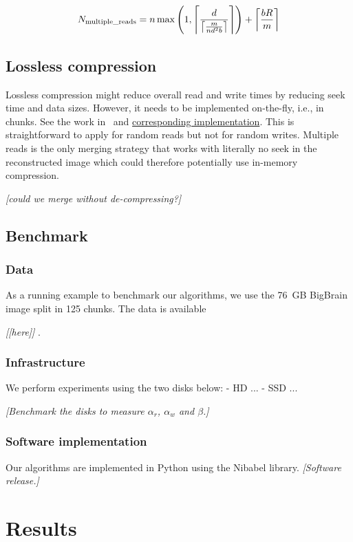 \documentclass[10pt, conference, compsocconf]{IEEEtran}
\DeclarePairedDelimiter{\ceil}{\lceil}{\rceil}
\newcommand{\todo}[1]{
  \color{red}\emph{[#1]}
  \color{black}
}
\begin{document}
\begin{equation}
  N_\mathrm{multiple\_reads}= n \max\left(1,\ceil*{\frac{d}{\ceil*{\frac{m}{nd^2b}}}}\right)+ \ceil*{\frac{bR}{m}}
\end{equation}

\subsection{Lossless compression}
     
Lossless compression might reduce overall read and write times by
reducing seek time and data sizes. However, it needs to be implemented
on-the-fly, i.e., in chunks. See the work in~\cite{rajna2015speeding}
and
\href{https://github.com/pauldmccarthy/indexed\_gzip}{corresponding
  implementation}. This is straightforward to apply for random reads
but not for random writes. Multiple reads is the only merging strategy
that works with literally no seek in the reconstructed image which
could therefore potentially use in-memory compression.

\todo{could we merge without de-compressing?}

\subsection{Benchmark}
\label{sec:benchmark}

\subsubsection{Data}
As a running example to benchmark our algorithms, we use the 76~GB
BigBrain image split in 125 chunks. The data is available
\todo{[here]}.

\subsubsection{Infrastructure}
 We
perform experiments using the two disks below:
- HD ...
- SSD ...

\todo{Benchmark the disks to measure $\alpha_r$, $\alpha_w$ and $\beta$.}

\subsubsection{Software implementation}

Our algorithms are implemented in Python using the Nibabel
library. \todo{Software release.}

\section{Results}
\label{sec:results}
\end{document}
